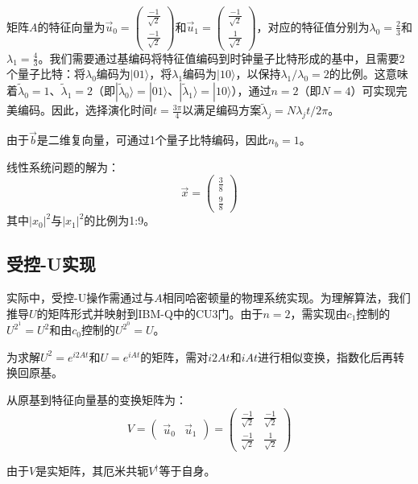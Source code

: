 \documentclass{article}
\begin{document}
矩阵\(A\)的特征向量为\(\vec{u}_0 = \begin{pmatrix} \frac{-1}{\sqrt{2}} \\ \frac{-1}{\sqrt{2}} \end{pmatrix}\)和\(\vec{u}_1 = \begin{pmatrix} \frac{-1}{\sqrt{2}} \\ \frac{1}{\sqrt{2}} \end{pmatrix}\)，对应的特征值分别为\(\lambda_0 = \frac{2}{3}\)和\(\lambda_1 = \frac{4}{3}\)。我们需要通过基编码将特征值编码到时钟量子比特形成的基中，且需要2个量子比特：将\(\lambda_0\)编码为\(|01\rangle\)，将\(\lambda_1\)编码为\(|10\rangle\)，以保持\(\lambda_1/\lambda_0 = 2\)的比例。这意味着\(\tilde{\lambda}_0 = 1\)、\(\tilde{\lambda}_1 = 2\)（即\(|\tilde{\lambda}_0\rangle = |01\rangle\)、\(|\tilde{\lambda}_1\rangle = |10\rangle\)），通过\(n=2\)（即\(N=4\)）可实现完美编码。因此，选择演化时间\(t = \frac{3\pi}{4}\)以满足编码方案\(\tilde{\lambda}_j = N\lambda_j t / 2\pi\)。

由于\(\vec{b}\)是二维复向量，可通过1个量子比特编码，因此\(n_b = 1\)。

线性系统问题的解为：
\[
\vec{x} = \begin{pmatrix} \frac{3}{8} \\ \frac{9}{8} \end{pmatrix}
\]
其中\(|x_0|^2\)与\(|x_1|^2\)的比例为1:9。

\subsection{受控-U实现}

实际中，受控-U操作需通过与\(A\)相同哈密顿量的物理系统实现。为理解算法，我们推导\(U\)的矩阵形式并映射到IBM-Q中的CU3门。由于\(n=2\)，需实现由\(c_1\)控制的\(U^{2^1} = U^2\)和由\(c_0\)控制的\(U^{2^0} = U\)。

为求解\(U^2 = e^{i2At}\)和\(U = e^{iAt}\)的矩阵，需对\(i2At\)和\(iAt\)进行相似变换，指数化后再转换回原基。

从原基到特征向量基的变换矩阵为：
\[
V = \begin{pmatrix} \vec{u}_0 & \vec{u}_1 \end{pmatrix} = \begin{pmatrix} \frac{-1}{\sqrt{2}} & \frac{-1}{\sqrt{2}} \\ \frac{-1}{\sqrt{2}} & \frac{1}{\sqrt{2}} \end{pmatrix}
\]

由于\(V\)是实矩阵，其厄米共轭\(V^\dagger\)等于自身。
\end{document}
